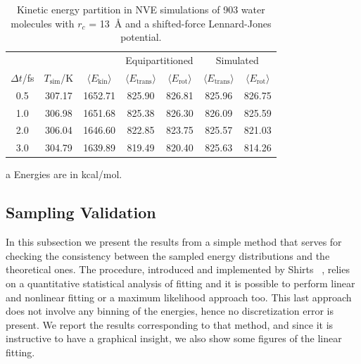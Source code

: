 \documentclass[aip,jcp,reprint,amsmath,amssymb]{revtex4-1}
\begin{document}
\begin{table}
	\begin{threeparttable}
		\caption{Kinetic energy partition in NVE simulations of 903 water molecules with $r_c$ = 13~{\r A} and a shifted-force Lennard-Jones potential.} %
		\label{table:water_partition_13A_LJ-SF}
		\begin{ruledtabular}
			\begin{tabular}{ccccccc}
				& & & \multicolumn{2}{c}{Equipartitioned} & \multicolumn{2}{c}{Simulated}\\
				\cline{4-7}
				$\Delta t$/fs & $T_\text{sim}$/K & $\langle E_\text{kin}\rangle$ & $\langle E_\text{trans}\rangle$ & $\langle E_\text{rot}\rangle$ & $\langle E_\text{trans}\rangle$ & $\langle E_\text{rot}\rangle$ \\
				\hline
				0.5 & 307.17 & 1652.71  & 825.90  & 826.81  & 825.96 & 826.75  \\
				1.0 & 306.98 & 1651.68  & 825.38  & 826.30  & 826.09 & 825.59  \\
				2.0 & 306.04 & 1646.60  & 822.85  & 823.75  & 825.57 & 821.03  \\
				3.0 & 304.79 & 1639.89  & 819.49  & 820.40  & 825.63 & 814.26
			\end{tabular}
		\end{ruledtabular}
		\begin{tablenotes}
			\item[a] Energies are in kcal/mol.
		\end{tablenotes}
	\end{threeparttable}
\end{table}

\subsection{Sampling Validation}
\label{sec:samplingvalidation}

In this subsection we present the results from a simple method that serves for checking the consistency between the sampled energy distributions and the theoretical ones. The procedure, introduced and implemented by Shirts ~\cite{Shirts2013}, relies on a quantitative statistical analysis of fitting and it is possible to perform linear and nonlinear fitting or a maximum likelihood approach too. This last approach does not involve any binning of the energies, hence no discretization error is present. We report the results corresponding to that method, and since it is instructive to have a graphical insight, we also show some figures of the linear fitting.
\end{document}
